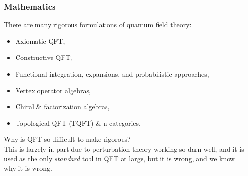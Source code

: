 \subsubsection*{Mathematics}

\noindent There are many rigorous formulations of quantum field theory:

\begin{itemize}
\item Axiomatic QFT,
\item Constructive QFT,
\item Functional integration, expansions, and probabilistic approaches,
\item Vertex operator algebras,
\item Chiral \& factorization algebras,
\item Topological QFT (TQFT) \& n-categories.
\end{itemize}

\noindent Why is QFT so difficult to make rigorous? \\

\noindent This is largely in part due to perturbation theory working so darn well, and it is used as the only \textit{standard} tool in QFT at large, but it is wrong, and we know why it is wrong. 


